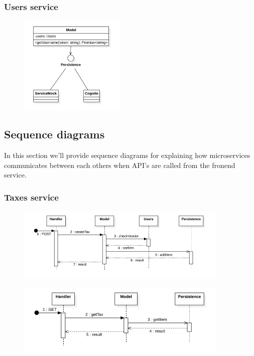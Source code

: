 \subsubsection{Users service}
\begin{figure}[H]
    \includegraphics[width=0.45\textwidth]{res/images/class-diagrams/users.png}
\end{figure}

\subsection{Sequence diagrams}
In this section we'll provide sequence diagrams for explaining how microservices communicates between each others
when API's are called from the fronend service.

\subsubsection{Taxes service}
\begin{figure}[H]
    \includegraphics[width=0.9\textwidth]{res/images/sequence-diagrams/taxes/createTax.png}
\end{figure}

\begin{figure}[H]
    \includegraphics[width=0.9\textwidth]{res/images/sequence-diagrams/taxes/getTax.png}
\end{figure}

